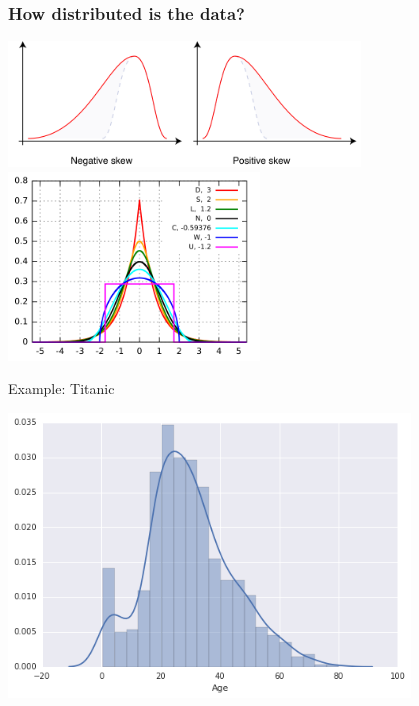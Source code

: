 \documentclass{beamer}
\begin{document}
    \begin{frame}
        \frametitle{How distributed is the data?}
        \begin{center}
            \includegraphics[width=0.7\textwidth]{figures/Skew.png}
            \includegraphics[width=0.5\textwidth]{figures/Kurtosis.png}
        \end{center}
    \end{frame}

    \begin{frame}{Example: Titanic}
        \begin{center}
            \includegraphics[width=0.8\textwidth]{figures/Titanic.png}
        \end{center}
    \end{frame}
\end{document}
